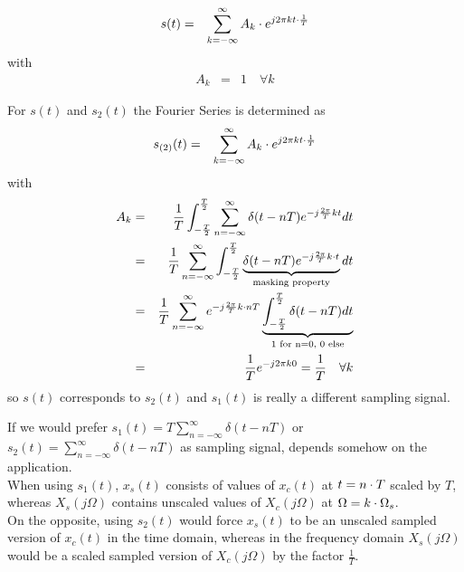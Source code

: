 \begin{eqnarray*}
s(t) & = & \sum_{k=-\infty}^{\infty} A_k \cdot e^{j2\pi k t \cdot \frac{1}{T}}
\end{eqnarray*}
with
\begin{eqnarray*}
A_k & = & 1 \quad \forall k
\end{eqnarray*}

For $s(t)$ and $s_2(t)$ the Fourier Series is determined as
\begin{eqnarray*}
s_{(2)}(t) & = & \sum_{k=-\infty}^{\infty} A_k \cdot e^{j2\pi k t \cdot \frac{1}{T}}
\end{eqnarray*}
with
\begin{eqnarray*}
A_k & = & \frac{1}{T} \int_{-\frac{T}{2}}^{\frac{T}{2}} \sum_{n=-\infty}^{\infty} \delta (t-nT) e^{-j \frac{2\pi}{T}kt}  dt \\
& = & \frac{1}{T}  \sum_{n=-\infty}^{\infty} \int_{-\frac{T}{2}}^{\frac{T}{2}} \underbrace{\delta (t-nT) e^{-j \frac{2\pi}{T}k\cdot t}}_{\text{masking property}} dt \\
& = & \frac{1}{T} \sum_{n=-\infty}^{\infty}  e^{-j \frac{2\pi}{T}k\cdot nT} \underbrace{\int_{-\frac{T}{2}}^{\frac{T}{2}}  \delta (t-nT) dt}_{\text{1 for n=0, 0 else}} \\
& = & \frac{1}{T} e^{-j 2 \pi k 0 } = \frac{1}{T} \quad \forall k
\end{eqnarray*}
so $s(t)$ corresponds to $s_2(t)$ and $s_1(t)$ is really a different sampling signal.

If we would prefer $s_1(t) = T \sum_{n=-\infty}^{\infty} \delta (t-nT)$ or $s_2(t) = \sum_{n=-\infty}^{\infty} \delta (t-nT)$ as sampling signal, depends somehow on the application.\\
When using $s_1(t)$, $x_s(t)$ consists of values of $x_c(t)$ at $t=n \cdot T$ scaled by $T$, whereas $X_s(j\Omega)$ contains unscaled values of $X_c(j\Omega)$ at $\Omega = k \cdot \Omega_s$.\\
On the opposite, using $s_2(t)$ would force $x_s(t)$ to be an unscaled sampled version of $x_c(t)$ in the time domain, whereas in the frequency domain $X_s(j\Omega)$ would be a scaled sampled version of $X_c(j\Omega)$ by the factor $\frac{1}{T}$.
